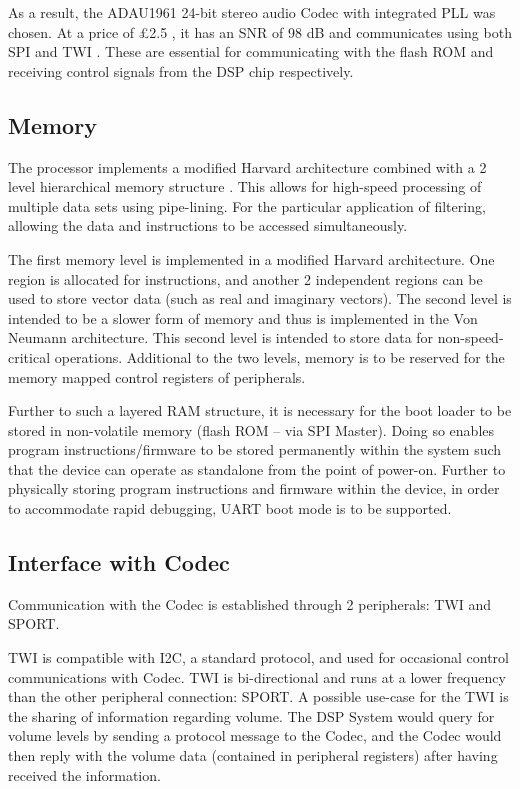 As a result, the ADAU1961 24-bit stereo audio Codec with integrated PLL was chosen. At a price of £2.5 \autocite{digikeyCodec}, it has an SNR of 98 dB and communicates using both SPI and TWI \autocite{codec_datasheet}. These are essential for communicating with the flash ROM and receiving control signals from the DSP chip respectively.



\subsection{Memory}
The processor implements a modified Harvard architecture combined with a 2 level hierarchical memory structure \autocite{blackfinDSP}. This allows for high-speed processing of multiple data sets using pipe-lining. For the particular application of filtering, allowing the data and instructions to be accessed simultaneously.

The first memory level is implemented in a modified Harvard architecture. One region is allocated for instructions, and another 2 independent regions can be used to store vector data (such as real and imaginary vectors). The second level is intended to be a slower form of memory and thus is implemented in the Von Neumann architecture. This second level is intended to store data for non-speed-critical operations. Additional to the two levels, memory is to be reserved for the memory mapped control registers of peripherals. 

Further to such a layered RAM structure, it is necessary for the boot loader to be stored in non-volatile memory (flash ROM – via SPI Master). Doing so enables program instructions/firmware to be stored permanently within the system such that the device can operate as standalone from the point of power-on. Further to physically storing program instructions and firmware within the device, in order to accommodate rapid debugging, UART boot mode is to be supported.

\subsection{Interface with Codec}
Communication with the Codec is established through 2 peripherals: TWI and SPORT.

TWI is compatible with I2C, a standard protocol, and used for occasional control communications with Codec. TWI is bi-directional and runs at a lower frequency than the other peripheral connection: SPORT. 
A possible use-case for the TWI is the sharing of information regarding volume. The DSP System would query for volume levels by sending a protocol message to the Codec, and the Codec would then reply with the volume data (contained in peripheral registers) after having received the information.

